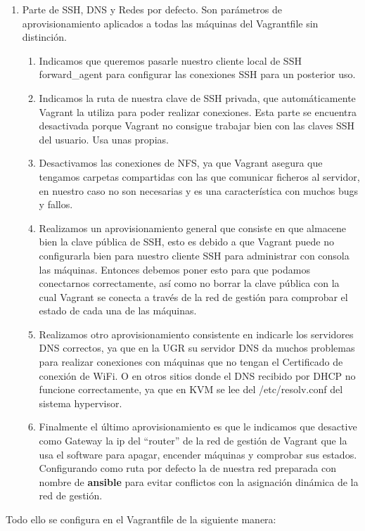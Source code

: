 \begin{enumerate}
    \item Parte de SSH, DNS y Redes por defecto. Son parámetros de aprovisionamiento aplicados a todas las máquinas del Vagrantfile sin distinción.
    \begin{enumerate}
        \item Indicamos que queremos pasarle nuestro cliente local de SSH  forward\_agent para configurar las conexiones SSH para un posterior uso.
        \item Indicamos la ruta de nuestra clave de SSH privada, que automáticamente Vagrant la utiliza para poder realizar conexiones. Esta parte se encuentra desactivada porque Vagrant no consigue trabajar bien con las claves SSH del usuario. Usa unas propias.
        \item Desactivamos las conexiones de NFS, ya que Vagrant asegura que tengamos carpetas compartidas con las que comunicar ficheros al servidor, en nuestro caso no son necesarias y es una característica con muchos bugs y fallos.
        \item Realizamos un aprovisionamiento general que consiste en que almacene bien la clave pública de SSH, esto es debido a que Vagrant puede no configurarla bien para nuestro cliente SSH para administrar con consola las máquinas. Entonces debemos poner esto para que podamos conectarnos correctamente, así como no borrar la clave pública con la cual Vagrant se conecta a través de la red de gestión para comprobar el estado de cada una de las máquinas.
        \item Realizamos otro aprovisionamiento consistente en indicarle los servidores DNS correctos, ya que en la UGR su servidor DNS da muchos problemas para realizar conexiones con máquinas que no tengan el Certificado de conexión de WiFi. O en otros sitios donde el DNS recibido por DHCP no funcione correctamente, ya que en KVM se lee del /etc/resolv.conf del sistema hypervisor.
        \item Finalmente el último aprovisionamiento es que le indicamos que desactive como Gateway la ip del ``router'' de la red de gestión de Vagrant que la usa el software para apagar, encender máquinas y comprobar sus estados. Configurando como ruta por defecto la de nuestra red preparada con nombre de \textbf{ansible} para evitar conflictos con la asignación dinámica de la red de gestión.
    \end{enumerate}
\end{enumerate}

Todo ello se configura en el Vagrantfile de la siguiente manera:

